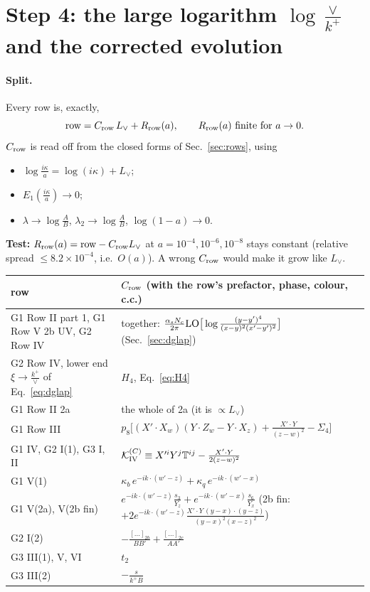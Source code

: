 \documentclass[10pt]{article}
\numberwithin{equation}{section}
\newcommand{\new}[1]{{\color{blue}#1}}
\newcommand{\Lv}{L_{\vee}}
\newcommand{\KK}{\mathcal K}
\begin{document}
\section{Step 4: the large logarithm \texorpdfstring{$\log\frac{\vee}{k^+}$}{log(vee/k+)} and the corrected evolution}\label{sec:split}
\paragraph{Split.} Every row is, exactly,
\begin{equation}
\text{row}=C_{\rm row}\,\Lv+R_{\rm row}(a),\qquad R_{\rm row}(a)\ \text{finite for }a\to0.
\end{equation}
$C_{\rm row}$ is read off from the closed forms of Sec.~\ref{sec:rows}, using
\begin{itemize}
\item $\log\frac{i\kappa}{a}=\log(i\kappa)+\Lv$;
\item $E_1(\frac{i\kappa}{a})\to0$;
\item $\lambda\to\log\frac AB$, $\lambda_2\to\log\frac AB$, $\log(1-a)\to0$.
\end{itemize}
\textbf{Test:} $R_{\rm row}(a)={\rm row}-C_{\rm row}\Lv$ at $a=10^{-4},10^{-6},10^{-8}$ stays constant (relative spread $\le$$8.2\times10^{-4}$, i.e.\ $O(a)$). A wrong $C_{\rm row}$ would make it grow like $\Lv$.
\begin{center}\small
\begin{tabular}{@{}ll@{}}\toprule
row & $C_{\rm row}$ (with the row's prefactor, phase, colour, c.c.)\\\midrule
G1 Row II part 1, G1 Row V 2b UV, G2 Row IV & together: $\frac{\alpha_sN_c}{2\pi}{\rm LO}\big[\log\frac{(y-y')^4}{(x-y)^2(x'-y')^2}\big]$ (Sec.~\ref{sec:dglap})\\
\new{G2 Row IV, lower end $\xi\to\frac{k^+}{\vee}$ of Eq.~\eqref{eq:dglap}} & \new{$H_4$, Eq.~\eqref{eq:H4}}\\
G1 Row II 2a & the whole of 2a (it is $\propto\Lv$)\\
G1 Row III & $p_8\big[(X'\!\cdot X_w)(Y\!\cdot Z_w-Y\!\cdot X_z)+\frac{X'\cdot Y}{(z-w)^2}-\Sigma_4\big]$\\
G1 IV, G2 I(1), G3 I, II & $\KK^{(C)}_{\rm IV}\equiv X'^iY^j\mathbb T^{ij}-\frac{X'\cdot Y}{2(z-w)^2}$\\
G1 V(1) & $\kappa_b\,e^{-ik\cdot(w'-z)}+\kappa_q\,e^{-ik\cdot(w'-x)}$\\
G1 V(2a), V(2b fin) & $e^{-ik\cdot(w'-z)}\frac{s_3}{Y_z}+e^{-ik\cdot(w'-x)}\frac{s_6}{Y_x}$ (2b fin: $+2e^{-ik\cdot(w'-z)}\frac{X'\cdot Y\,(y-x)\cdot(y-z)}{(y-x)^2(x-z)^2}$)\\
G2 I(2) & $-\frac{[\dots]_{2b}}{BB'}+\frac{[\dots]_{2c}}{AA'}$\\
G3 III(1), V, VI & $t_2$\\
G3 III(2) & $-\frac{s}{k^+B}$\\\bottomrule
\end{tabular}
\end{center}
\end{document}
